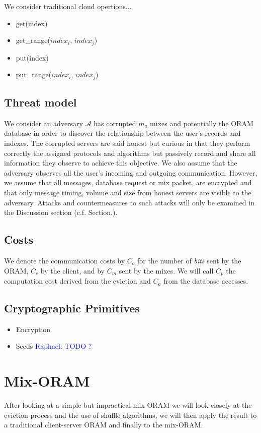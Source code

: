 \documentclass[conference]{IEEEtran}
\newcommand{\raphael}[1]{\textcolor{blue}{Raphael: #1}}
\begin{document}
We consider traditional cloud opertions...
\begin{itemize}
 \item get(index)
 \item get\_range($index_i$, $index_j$)
 \item put(index) 
 \item put\_range($index_i$, $index_j$)
\end{itemize}

\subsection{Threat model}
We consider an adversary $\mathcal{A}$ has corrupted $m_{a}$ mixes and potentially the ORAM database in order to discover the relationship between the user's records and indexes. 
The corrupted servers are said honest but curious in that they perform correctly the assigned protocols and algorithms but passively record and share all information they observe to achieve this objective.
We also assume that the adversary observes all the user's incoming and outgoing communication. However, we assume that all messages, database request or mix packet, are encrypted and that only message timing, volume and size from honest servers are visible to the adversary.
Attacks and countermeasures to such attacks will only be examined in the Discussion section (c.f. Section.\cite{}).

\subsection{Costs}
We denote the communication costs by $C_o$ for the number of \emph{bits} sent by the ORAM, $C_{c}$ by the client, and by $C_{m}$ sent by the mixes. 
We will call $C_p$ the computation cost derived from the eviction and $C_a$ from the database accesses.

\subsection{Cryptographic Primitives}
\begin{itemize}
 \item Encryption 
 \item Seeds \raphael{TODO ?}
\end{itemize}

\section{Mix-ORAM}
\label{section2}
After looking at a simple but impractical mix ORAM we will look closely at the eviction process and the use of shuffle algorithms, we will then apply the result to a traditional client-server ORAM and finally to the mix-ORAM.
\end{document}
